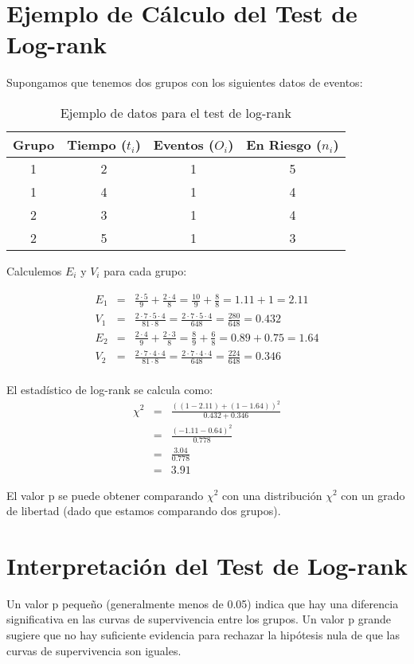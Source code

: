 \documentclass[a4paper]{report} %
\begin{document}
\section{Ejemplo de C\'alculo del Test de Log-rank}
Supongamos que tenemos dos grupos con los siguientes datos de eventos:

\begin{table}[h]
\centering
\begin{tabular}{|c|c|c|c|}
\hline
Grupo & Tiempo ($t_i$) & Eventos ($O_i$) & En Riesgo ($n_i$) \\
\hline
1 & 2 & 1 & 5 \\
1 & 4 & 1 & 4 \\
2 & 3 & 1 & 4 \\
2 & 5 & 1 & 3 \\
\hline
\end{tabular}
\caption{Ejemplo de datos para el test de log-rank}
\end{table}

Calculemos $E_i$ y $V_i$ para cada grupo:

\begin{eqnarray*}
E_1 &=& \frac{2 \cdot 5}{9} + \frac{2 \cdot 4}{8} = \frac{10}{9} + \frac{8}{8} = 1.11 + 1 = 2.11 \\
V_1 &=& \frac{2 \cdot 7 \cdot 5 \cdot 4}{81 \cdot 8} = \frac{2 \cdot 7 \cdot 5 \cdot 4}{648} = \frac{280}{648} = 0.432 \\
E_2 &=& \frac{2 \cdot 4}{9} + \frac{2 \cdot 3}{8} = \frac{8}{9} + \frac{6}{8} = 0.89 + 0.75 = 1.64 \\
V_2 &=& \frac{2 \cdot 7 \cdot 4 \cdot 4}{81 \cdot 8} = \frac{2 \cdot 7 \cdot 4 \cdot 4}{648} = \frac{224}{648} = 0.346 \\
\end{eqnarray*}

El estad\'istico de log-rank se calcula como:
\begin{eqnarray*}
\chi^2 &=& \frac{\left((1 - 2.11) + (1 - 1.64)\right)^2}{0.432 + 0.346} \\
       &=& \frac{\left(-1.11 - 0.64\right)^2}{0.778} \\
       &=& \frac{3.04}{0.778} \\
       &=& 3.91
\end{eqnarray*}

El valor p se puede obtener comparando $\chi^2$ con una distribuci\'on $\chi^2$ con un grado de libertad (dado que estamos comparando dos grupos).

\section{Interpretaci\'on del Test de Log-rank}
Un valor p peque\~no (generalmente menos de 0.05) indica que hay una diferencia significativa en las curvas de supervivencia entre los grupos. Un valor p grande sugiere que no hay suficiente evidencia para rechazar la hip\'otesis nula de que las curvas de supervivencia son iguales.
\end{document}
